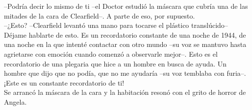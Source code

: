 --Podría decir lo mismo de ti --el Doctor estudió la máscara que cubría
una de las mitades de la cara de Clearfield--. A parte de eso, por
supuesto.\\
--¿Esto? --Clearfield levantó una mano para tocarse el plástico
translúcido-- Déjame hablarte de esto. Es un recordatorio constante de
una noche de 1944, de una noche en la que intenté contactar con otro
mundo --su voz se mantuvo hasta agrietarse con emoción cuando comenzó a
observarle mejor--. Esto es el recordatorio de una plegaria que hice a
un hombre en busca de ayuda. Un hombre que dijo que no podía, que no me
ayudaría --su voz temblaba con furia--. ¡Este es un constante
recordatorio de ti!\\
Se arrancó la máscara de la cara y la habitación resonó con el grito de
horror de Angela.
